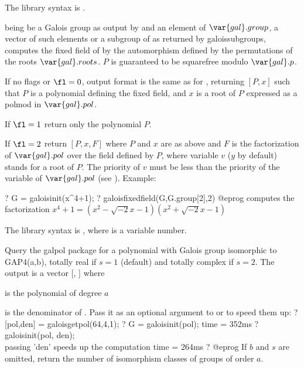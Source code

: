 The library syntax is .

\label{se:galoisfixedfield}
 being be a Galois group as output by  and
 an element of $\var{gal}.group$, a vector of such elements
or a subgroup of  as returned by galoissubgroups,
computes the fixed field of  by the automorphism defined by the
permutations  of the roots $\var{gal}.roots$. $P$ is guaranteed to
be squarefree modulo $\var{gal}.p$.

If no flags or $\fl=0$, output format is the same as for ,
returning $[P,x]$ such that $P$ is a polynomial defining the fixed field, and
$x$ is a root of $P$ expressed as a polmod in $\var{gal}.pol$.

If $\fl=1$ return only the polynomial $P$.

If $\fl=2$ return $[P,x,F]$ where $P$ and $x$ are as above and $F$ is the
factorization of $\var{gal}.pol$ over the field defined by $P$, where
variable $v$ ($y$ by default) stands for a root of $P$. The priority of $v$
must be less than the priority of the variable of $\var{gal}.pol$ (see
). Example:

\bprog
? G = galoisinit(x^4+1);
? galoisfixedfield(G,G.group[2],2)
@eprog\noindent
computes the factorization  $x^4+1=(x^2-\sqrt{-2}x-1)(x^2+\sqrt{-2}x-1)$

The library syntax is , where  is a variable number.

\label{se:galoisgetpol}
Query the galpol package for a polynomial with Galois group isomorphic to
GAP4(a,b), totally real if $s=1$ (default) and totally complex if $s=2$. The
output is a vector [, ] where

\item  {} is the polynomial of degree $a$

\item {} is the denominator of .
Pass it as an optional argument to  or  to
speed them up:
\bprog
? [pol,den] = galoisgetpol(64,4,1);
? G = galoisinit(pol);
time = 352ms
? galoisinit(pol, den);  \\ passing 'den' speeds up the computation
time = 264ms
? %
@eprog
If $b$ and $s$ are omitted, return the number of isomorphism classes of
groups of order $a$.

